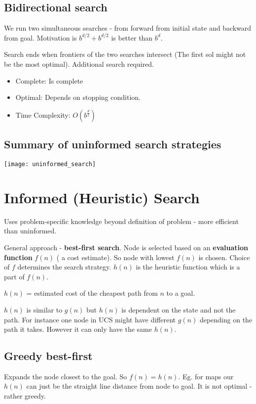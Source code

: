 \subsection{Bidirectional search}
We run two simultaneous searches - from forward from initial state and backward from goal. Motivation is $b^{d /2} + b^{d /2}$ is better than $b^{d}$. 

Search ends when frontiers of the two searches intersect (The first sol might not be the most optimal). Additional search required. 



\begin{itemize}
    \item Complete: Is complete
    \item Optimal: Depends on stopping condition.
    \item Time Complexity: $O(b^{\frac{d}{2}})$
\end{itemize}


\subsection{Summary of uninformed search strategies}

\texttt{[image: uninformed\_search]}


\section{Informed (Heuristic) Search}
Uses problem-specific knowledge beyond definition of problem - more efficient than uninformed.

General approach - \textbf{best-first search}. Node is selected based on an \textbf{evaluation function} $f(n)$ ( a cost estimate). So node with lowest  $f(n)$ is chosen.  Choice of $f$ determines the search strategy. $h(n)$ is the heuristic function which is a part of $f(n)$.

\begin{center}
$h(n)$ = estimated cost of the cheapest path from $n$ to a goal.
\end{center}

$h(n)$ is similar to $g(n)$ but $h(n)$ is dependent on the state and not the path. For instance one node in UCS might have different $g(n)$ depending on the path it takes. However it can only have the same  $h(n)$.

\subsection{Greedy best-first}
Expands the node closest to the goal. So $f(n) = h(n)$. Eg. for maps our  $h(n)$ can just be the straight line distance from node to goal. It is not optimal - rather greedy.

